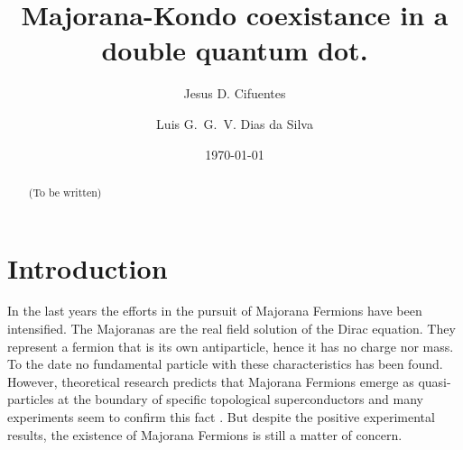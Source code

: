 \documentclass[showpacs,aps,prb,reprint,superscriptaddress]{revtex4-1}
\begin{document}
\newcommand{\be}   {\begin{equation}}
\newcommand{\ee}   {\end{equation}}
\newcommand{\ba}   {\begin{eqnarray}}
\newcommand{\ea}   {\end{eqnarray}}
\newcommand{\ve}  {\varepsilon}

\newcommand{\nhat}{\hat{n}}
\newcommand{\veck}{\textbf{k}}
\newcommand\ep{\epsilon}
\newcommand\g{\gamma}
\newcommand\s{\sigma}
\newcommand\up{\uparrow}
\newcommand\dw{\downarrow}
\newcommand\down{\downarrow}
\newcommand{\ed}[1]{\ep_{d#1}}
\newcommand{\ket}[1]{\vert #1 \rangle}
\newcommand{\ann}{a^{\dagger}}
\newcommand{\dann}{d^{\dagger}}
\newcommand{\tdots}{t_{dots}}
\newcommand{\gammaA}[1]{\gamma_{A,#1}}
\newcommand{\gammaB}[1]{\gamma_{B,#1}}

\newcommand{\super}{\vert \Delta \vert}





\title{ Majorana-Kondo coexistance in a double quantum dot. }

\author{Jesus D. Cifuentes}
\author{Luis G.~G.~V. Dias da Silva}

\date{ \today }

\begin{abstract}

(To be written)


\end{abstract} 

\maketitle


\section{Introduction}
\label{sec:Intro}

In the last years the efforts in the pursuit of Majorana Fermions\cite{Kitaev:P.U:2001} have been intensified. The Majoranas are the real field solution of the Dirac equation. They represent  a fermion that is its own antiparticle, hence it has no charge nor mass. To the date no fundamental particle with these characteristics has been found. However, theoretical research predicts that Majorana Fermions emerge as quasi-particles at the boundary of specific topological superconductors and many experiments seem to confirm this fact  \citep{mourik_signatures_2012,das_zero-bias_2012,deng_anomalous_2012,zhang_quantized_2018}. But despite the positive experimental results, the existence of  Majorana   Fermions is still a matter of concern.
\end{document}
